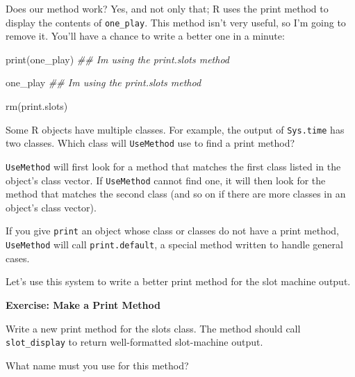 \documentclass[
  letterpaper,
  DIV=11,
  numbers=noendperiod]{scrbook}
\newenvironment{Shaded}{\begin{snugshade}}{\end{snugshade}}
\newcommand{\DocumentationTok}[1]{\textcolor[rgb]{0.37,0.37,0.37}{\textit{#1}}}
\newcommand{\FunctionTok}[1]{\textcolor[rgb]{0.28,0.35,0.67}{#1}}
\newcommand{\NormalTok}[1]{\textcolor[rgb]{0.00,0.23,0.31}{#1}}
\newcommand{\OtherTok}[1]{\textcolor[rgb]{0.00,0.23,0.31}{#1}}
\begin{document}
Does our method work? Yes, and not only that; R uses the print method to
display the contents of \texttt{one\_play}. This method isn't very
useful, so I'm going to remove it. You'll have a chance to write a
better one in a minute:

\begin{Shaded}
\begin{Highlighting}[]
\FunctionTok{print}\NormalTok{(one\_play)}
\DocumentationTok{\#\# I\textquotesingle{}m using the print.slots method}

\NormalTok{one\_play}
\DocumentationTok{\#\# I\textquotesingle{}m using the print.slots method}

\FunctionTok{rm}\NormalTok{(print.slots)}
\end{Highlighting}
\end{Shaded}

Some R objects have multiple classes. For example, the output of
\texttt{Sys.time} has two classes. Which class will \texttt{UseMethod}
use to find a print method?

\begin{Shaded}
\end{Shaded}

\texttt{UseMethod} will first look for a method that matches the first
class listed in the object's class vector. If \texttt{UseMethod} cannot
find one, it will then look for the method that matches the second class
(and so on if there are more classes in an object's class vector).

If you give \texttt{print} an object whose class or classes do not have
a print method, \texttt{UseMethod} will call \texttt{print.default}, a
special method written to handle general cases.

Let's use this system to write a better print method for the slot
machine output.

\begin{tcolorbox}[enhanced jigsaw, left=2mm, breakable, colback=white, colframe=quarto-callout-color-frame, leftrule=.75mm, bottomrule=.15mm, arc=.35mm, opacityback=0, rightrule=.15mm, toprule=.15mm]

\vspace{-3mm}\textbf{Exercise: Make a Print Method}\vspace{3mm}

Write a new print method for the slots class. The method should call
\texttt{slot\_display} to return well-formatted slot-machine output.

What name must you use for this method?

\end{tcolorbox}
\end{document}
